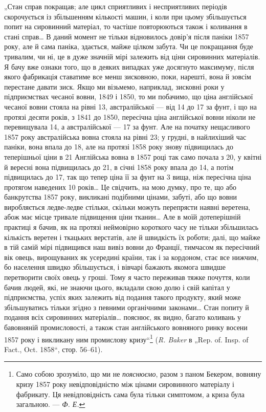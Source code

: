 
„Стан справ покращав; але цикл сприятливих і несприятливих
періодів скорочується із збільшенням кількості машин, і
коли при цьому збільшується попит на сировинний матеріал,
то частіше повторюються також і коливання в стані справ\dots{}
В даний момент не тільки відновилось довір’я після паніки
1857 року, але й сама паніка, здається, майже цілком забута.
Чи це покращання буде тривалим, чи ні, це в дуже значній
мірі залежить від ціни сировинних матеріалів. Я бачу вже ознаки
того, що в деяких випадках уже досягнуто максимуму, після
якого фабрикація ставатиме все менш зисковною, поки, нарешті,
вона й зовсім перестане давати зиск. Якщо ми візьмемо, наприклад,
зисковні роки у підприємствах чесаної вовни, 1849 і 1850,
то ми побачимо, що ціна англійської чесаної вовни стояла на
рівні 13, австралійської — від 14 до 17 за фунт,
і що на протязі десяти років, з 1841 до 1850, пересічна ціна
англійської вовни ніколи не перевищувала 14, а австралійської
— 17 за фунт. Але на початку нещасливого
1857 року австралійська вовна стояла на рівні 23; у грудні,
в найлихіший час паніки, вона впала до 18, але на протязі
1858 року знову підвищилась до теперішньої ціни в 21
Англійська вовна в 1857 році так само почала з 20, у квітні
й вересні вона підвищилась до 21, в січні 1858 року впала
до 14, а потім підвищилась до 17, так що тепер
ціна її за фунт на 3 вища, ніж пересічна ціна протягом
наведених 10 років\dots{} Це свідчить, на мою думку, про те, що або
банкрутства 1857 року, викликані подібними цінами, забуті, або
що вовни виробляється ледве-ледве стільки, скільки можуть
перепрясти наявні веретена, абож має місце тривале підвищення
ціни тканин\dots{} Але в моїй дотеперішній практиці я бачив,
як на протязі неймовірно короткого часу не тільки збільшилась
кількість веретен і ткацьких верстатів, але й швидкість
їх роботи; далі, що майже в тій самій мірі підвищився наш вивіз
вовни до Франції, тимчасом як пересічний вік овець, вирощуваних
як усередині країни, так і за кордоном, стає все нижчим,
бо населення швидко збільшується, і вівчарі бажають якомога
швидше перетворити своїх овець у гроші. Тому я часто переживав
тяжке почуття, коли бачив людей, які, не знаючи цього, вкладали
свою долю і свій капітал у підприємства, успіх яких залежить від
подання такого продукту, який може збільшуватись тільки
згідно з певними органічними законами\dots{} Стан попиту й подання
всіх сировинних матеріалів\dots{} пояснює, як видно, багато коливань
у бавовняній промисловості, а також стан англійського вовняного
ринку восени 1857 року і викликану ним промислову кризу“\footnote{Само собою зрозуміло, що ми не \emph{пояснюємо}, разом з паном Бекером,
вовняну кризу 1857 року невідповідністю між цінами сировинного матеріалу
і фабрикату. Ця невідповідність сама була тільки симптомом, а криза була
загальною. — \emph{Ф. Е.}}
(\emph{R. Baker} в „Rep. of. Insp. of Fact., Oct. 1858“, стор. 56--61).
